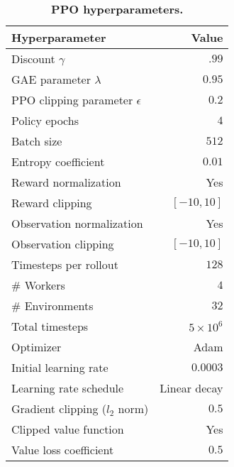 \begin{table}
    \begin{center}
    \begin{tabular}{lr}
    \toprule
    \textbf{Hyperparameter} & \textbf{Value}  \\
    \midrule
    Discount $\gamma$ & $.99$ \\
    GAE parameter $\lambda$ & $0.95$ \\
    PPO clipping parameter $\epsilon$ & $0.2$ \\
    Policy epochs & $4$ \\
    Batch size & $512$ \\
    Entropy coefficient & $0.01$ \\
    Reward normalization & Yes \\
    Reward clipping & $[-10, 10]$ \\
    Observation normalization & Yes \\
    Observation clipping & $[-10, 10]$ \\
    Timesteps per rollout & $128$\\
    \# Workers & $4$\\
    \# Environments & $32$\\
    Total timesteps & $5 \times 10^6$\\
    Optimizer    & Adam  \\ 
    Initial learning rate & $0.0003$ \\
    Learning rate schedule & Linear decay \\
    Gradient clipping ($l_2$ norm) & $0.5$ \\
    Clipped value function & Yes \\
    Value loss coefficient & $0.5$ \\
    \bottomrule
    \end{tabular}
    \caption{\textbf{PPO hyperparameters.}}
    \label{table:ppo_hyper}
    \end{center}
    \vspace{-8mm}
    \end{table}